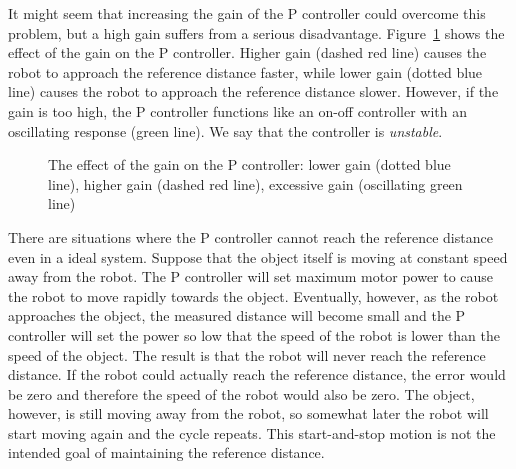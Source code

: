 It might seem that increasing the gain of the P controller could overcome this problem, but a high gain suffers from a serious disadvantage. Figure~\ref{fig.gain} shows the effect of the gain on the P controller. Higher gain (dashed red line) causes the robot to approach the reference distance faster, while lower gain (dotted blue line) causes the robot to approach the reference distance slower. However, if the gain is too high, the P controller functions like an on-off controller with an oscillating response (green line). We say that the controller is \emph{unstable}.

\begin{figure}
\begin{center}
\caption{The effect of the gain on the P controller: lower gain (dotted blue line), higher gain (dashed red line), excessive gain (oscillating green line)}\label{fig.gain}
\end{center}
\end{figure}

There are situations where the P controller cannot reach the reference distance even in a ideal system. Suppose that the object itself is moving at constant speed away from the robot. The P controller will set maximum motor power to cause the robot to move rapidly towards the object. Eventually, however, as the robot approaches the object, the measured distance will become small and the P controller will set the power so low that the speed of the robot is lower than the speed of the object. The result is that the robot will never reach the reference distance. If the robot could actually reach the reference distance, the error would be zero and therefore the speed of the robot would also be zero. The object, however, is still moving away from the robot, so somewhat later the robot will start moving again and the cycle repeats. This start-and-stop motion is not the intended goal of maintaining the reference distance.

